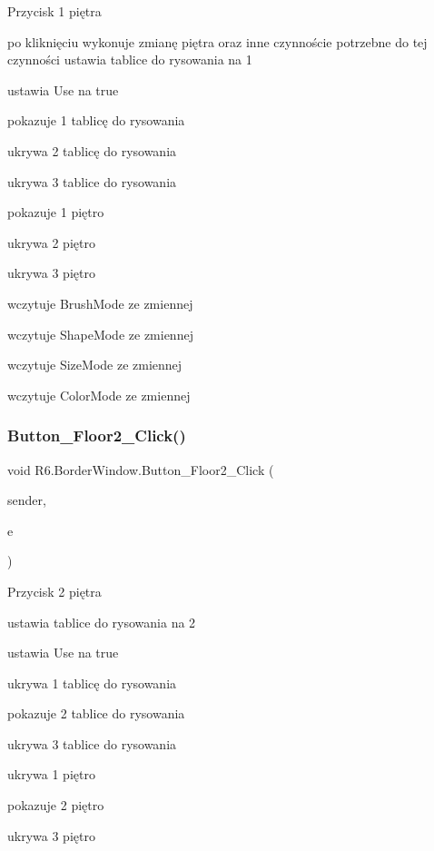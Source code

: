Przycisk 1 piętra 

po kliknięciu wykonuje zmianę piętra oraz inne czynnoście potrzebne do tej czynności ustawia tablice do rysowania na 1 

ustawia Use na true 

pokazuje 1 tablicę do rysowania 

ukrywa 2 tablicę do rysowania 

ukrywa 3 tablice do rysowania 

pokazuje 1 piętro 

ukrywa 2 piętro 

ukrywa 3 piętro 

wczytuje Brush\+Mode ze zmiennej 

wczytuje Shape\+Mode ze zmiennej 

wczytuje Size\+Mode ze zmiennej 

wczytuje Color\+Mode ze zmiennej \mbox{\label{class_r6_1_1_border_window_a6f3bb94485f373bb58049c1d7af5d13d}} 
\subsubsection{\texorpdfstring{Button\_Floor2\_Click()}{Button\_Floor2\_Click()}}
{\footnotesize\ttfamily void R6.\+Border\+Window.\+Button\+\_\+\+Floor2\+\_\+\+Click (\begin{DoxyParamCaption}\item[{object}]{sender,  }\item[{Routed\+Event\+Args}]{e }\end{DoxyParamCaption})\hspace{0.3cm}{\ttfamily [private]}}



Przycisk 2 piętra 

ustawia tablice do rysowania na 2 

ustawia Use na true 

ukrywa 1 tablicę do rysowania 

pokazuje 2 tablice do rysowania 

ukrywa 3 tablice do rysowania 

ukrywa 1 piętro 

pokazuje 2 piętro 

ukrywa 3 piętro 

